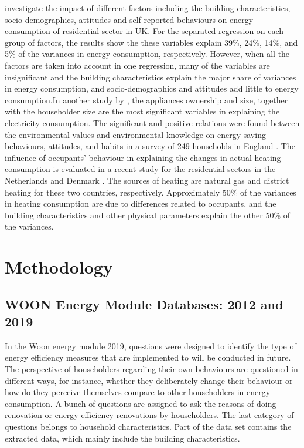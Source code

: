 \documentclass[preprint,12pt,3p]{elsarticle}
\begin{document}
\citeauthor{huebner2015} \citeyearpar{huebner2015} investigate the impact of different factors including the building characteristics, socio-demographics, attitudes and self-reported behaviours on energy consumption of residential sector in UK. For the separated regression on each group of factors, the results show the these variables explain 39\%, 24\%, 14\%, and 5\% of the variances in energy consumption, respectively. However, when all the factors are taken into account in one regression, many of the variables are insignificant and the building characteristics explain the major share of variances in energy consumption, and socio-demographics and attitudes add little to energy consumption.In another study by \citep{huebner2016}, the appliances ownership and size, together with the householder size are the most significant variables in explaining the electricity consumption. The significant and positive relations were found between the environmental values and environmental knowledge on energy saving behaviours, attitudes, and habits in a survey of 249 households in England \citep{pothitou2016}. The influence of occupants' behaviour in explaining the changes in actual heating consumption is evaluated in a recent study for the residential sectors in the Netherlands and Denmark \citep{van2019}. The sources of heating are natural gas and district heating for these two countries, respectively. Approximately 50\% of the variances in heating consumption are due to differences related to occupants, and the building characteristics and other physical parameters explain the other 50\% of the variances. 


\section{Methodology}
\label{sec3}

\subsection{WOON Energy Module Databases: 2012 and 2019}

In the Woon energy module 2019, questions were designed to identify the type of energy efficiency measures that are implemented to will be conducted in future. The perspective of householders regarding their own behaviours are questioned in different ways, for instance, whether they deliberately change their behaviour or how do they perceive themselves compare to other householders in energy consumption. A bunch of questions are assigned to ask the reasons of doing renovation or energy efficiency renovations by householders. The last category of questions belongs to household characteristics. Part of the data set contains the extracted data, which mainly include the building characteristics. 
\end{document}
